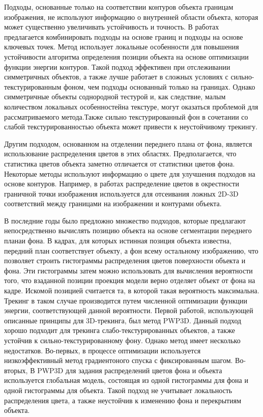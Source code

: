 Подходы, основанные только на соответствии контуров объекта границам
изображения,
не используют информацию о внутренней области объекта, которая может
существенно
увеличивать устойчивость и точность. В работах
\cite{VacchettiEdges2004,ChoiFeaturesAndEdges,Bugaev_2018_ECCV} предлагается
комбинировать подходы на основе границ и подходы на основе ключевых точек.
Метод
\cite{Bugaev_2018_ECCV} использует локальные особенности для повышения
устойчивости алгоритма определения позиции объекта на основе оптимизации
функции
энергии контуров. Такой подход эффективен при отслеживании симметричных
объектов, а также лучше работает в сложных условиях с сильно-текстурированным
фоном, чем подходы основанный только на границах. Однако симметричные объекты
соднородной тестурой и, как следствие, малым количеством локальных
особенностейна текстуре, могут оказаться проблемой для рассматриваемого
метода.Также
сильно
текстурированный фон в сочетании со слабой текстурированностью объекта может
привести к неустойчивому трекингу.

Другим подходом, основанном на отделении переднего плана от фона,
является использование распределения цветов в этих областях. Предполагается,
что
статистика цветов объекта заметно отличается от статистики цветов фона.
Некоторые методы \cite{SeoHinterstoisser2014,WangZhong2015,Zhong2018}
используют
информацию о цвете для улучшения подходов на основе контуров. Например, в
работах \cite{SeoHinterstoisser2014,WangZhong2015} распределение цветов в
окрестности граничной точки изображения используется для отсеивания ложных
2D-3D
соответствий между границами на изображении и контурами объекта.

В последние годы было предложно множество подходов, которые предлагают
непосредственно вычислять позицию объекта на основе сегментации переднего
планаи фона. В кадрах, для которых истинная позиция объекта известна, передний
план
соответствует объекту, а фон всему остальному изображению, что позволяет
строить гистограммы распределения цветов поверхности объекта и фона.
Эти гистограммы затем можно использовать для вычисления вероятности того, что
взаданной позиции проекция модели верно отделяет объект от фона на кадре.
Искомой позицией считается та, в которой такая вероятность максимальна.
Трекинг в таком случае производится путем численной оптимизации функции
энергии, соответствующей данной вероятности.
Первой работой, использующей описанные принципы для 3D-трекинга,
был метод PWP3D\cite{PWP3D}. Данный подход хорошо подходит для трекинга
слабо-текстурированных объектов, а также устойчив к сильно-текстурированному
фону. Однако метод имеет несколько недостатков.
Во-первых, в процессе оптимизации используется низкоэффективный метод
градиентоного спуска с фиксированным шагом. Во-вторых, В PWP3D для задания
распределений цветов фона и объекта используется глобальная модель, состоящая
из
одной гистограммы для фона и одной гистограммы для объекта. Такой подход не
учитывает локальность распределения цвета, а также неустойчив к изменению фона
и
перекрытиям объекта.

